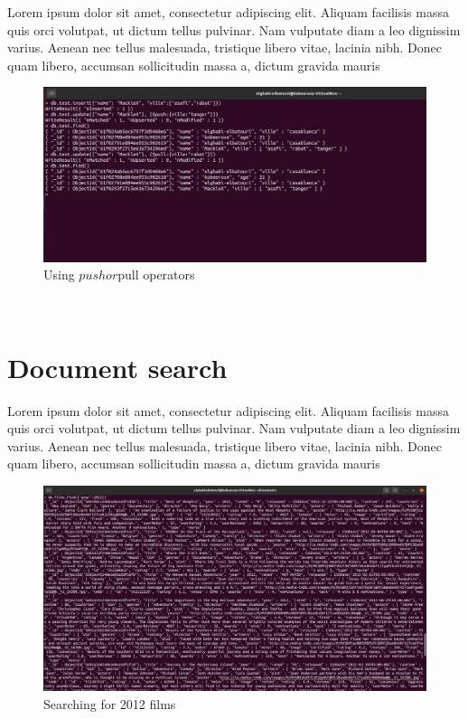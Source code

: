 \begin{spacing}{1.2}
\par Lorem ipsum dolor sit amet, consectetur adipiscing elit. Aliquam facilisis massa quis orci volutpat, ut dictum tellus pulvinar. Nam vulputate diam a leo dignissim varius. Aenean nec tellus malesuada, tristique libero vitae, lacinia nibh. Donec quam libero, accumsan sollicitudin massa a, dictum gravida mauris
\\
\begin{figure}[!htb] 
\begin{center} 
\includegraphics[width=1\linewidth]{Pictures/MongoDB/Examining MongoDB Query Features/Deleting and Updating documents/Using $push or $pull operators} 
\end{center} 
\caption{Using $push or $pull operators} 
\end{figure}  \FloatBarrier
\\
\section{Document search }
\par Lorem ipsum dolor sit amet, consectetur adipiscing elit. Aliquam facilisis massa quis orci volutpat, ut dictum tellus pulvinar. Nam vulputate diam a leo dignissim varius. Aenean nec tellus malesuada, tristique libero vitae, lacinia nibh. Donec quam libero, accumsan sollicitudin massa a, dictum gravida mauris
\\
\begin{figure}[!htb] 
\begin{center} 
\includegraphics[width=1\linewidth]{Pictures/MongoDB/Examining MongoDB Query Features/Document search/Searching for 2012 films} 
\end{center} 
\caption{Searching for 2012 films} 
\end{figure}  \FloatBarrier
\\


\end{spacing}
